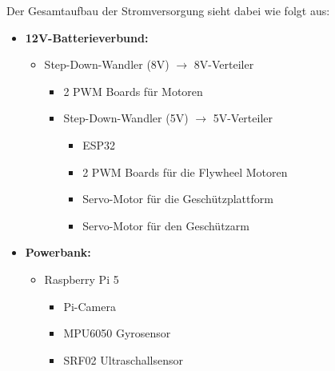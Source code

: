 Der Gesamtaufbau der Stromversorgung sieht dabei wie folgt aus:
\begin{itemize}
    \item \textbf{12V-Batterieverbund:}
    \begin{itemize}
        \item Step-Down-Wandler (8V) $\rightarrow$ 8V-Verteiler
        \begin{itemize}
            \item 2 PWM Boards für Motoren
            \item Step-Down-Wandler (5V) $\rightarrow$ 5V-Verteiler
            \begin{itemize}
                \item ESP32
                \item 2 PWM Boards für die Flywheel Motoren
                \item Servo-Motor für die Geschützplattform
                \item Servo-Motor für den Geschützarm
            \end{itemize}
        \end{itemize}
    \end{itemize}
    
    \item \textbf{Powerbank:}
    \begin{itemize}
        \item Raspberry Pi 5
        \begin{itemize}
            \item Pi-Camera
            \item MPU6050 Gyrosensor
            \item SRF02 Ultraschallsensor
        \end{itemize}
    \end{itemize}
\end{itemize}